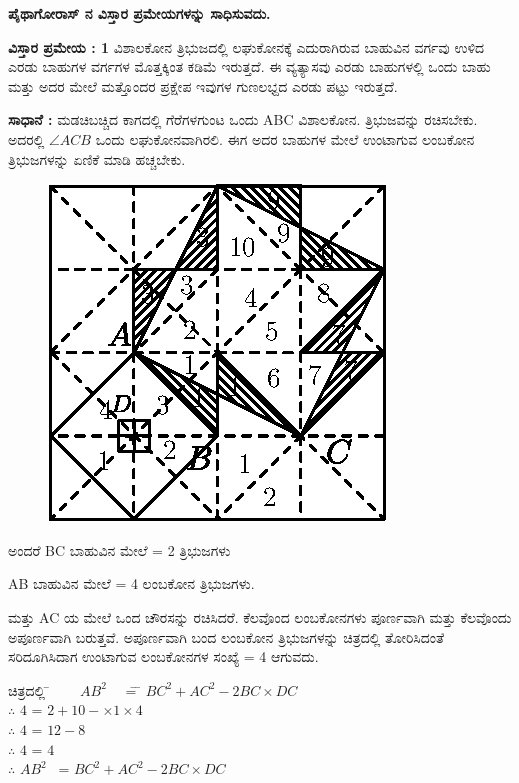 \medskip
\noindent
\textbf{ಪೈಥಾಗೋರಾಸ್ ನ ವಿಸ್ತಾರ ಪ್ರಮೇಯಗಳನ್ನು ಸಾಧಿಸುವದು.}

\medskip
\noindent
\textbf{ವಿಸ್ತಾರ ಪ್ರಮೇಯ : 1} ವಿಶಾಲಕೋನ ತ್ರಿಭುಜದಲ್ಲಿ ಲಘುಕೋನಕ್ಕೆ ಎದುರಾಗಿರುವ ಬಾಹುವಿನ ವರ್ಗವು ಉಳಿದ ಎರಡು ಬಾಹುಗಳ ವರ್ಗಗಳ ಮೊತ್ತಕ್ಕಿಂತ ಕಡಿಮೆ ಇರುತ್ತದೆ. ಈ ವ್ಯತ್ಯಾಸವು ಎರಡು ಬಾಹುಗಳಲ್ಲಿ ಒಂದು ಬಾಹು ಮತ್ತು ಅದರ ಮೇಲೆ ಮತ್ತೊಂದರ ಪ್ರಕ್ಷೇಪ ಇವುಗಳ ಗುಣಲಭ್ದದ ಎರಡು ಪಟ್ಟು ಇರುತ್ತದೆ. 

\medskip
\noindent
\textbf{ಸಾಧಾನೆ :} ಮಡಚಿಬಚ್ಚಿದ ಕಾಗದಲ್ಲಿ ಗೆರೆಗಳಗುಂಟ ಒಂದು ABC ವಿಶಾಲಕೋನ. ತ್ರಿಭುಜವನ್ನು ರಚಿಸಬೇಕು. ಅದರಲ್ಲಿ $\angle ACB$ ಒಂದು ಲಘುಕೋನವಾಗಿರಲಿ. ಈಗ ಅದರ ಬಾಹುಗಳ ಮೇಲೆ ಉಂಟಾಗುವ ಲಂಬಕೋನ ತ್ರಿಭುಜಗಳನ್ನು ಏಣಿಕೆ ಮಾಡಿ ಹಚ್ಚಬೇಕು. 
\begin{figure}[H]
\centering
\includegraphics[scale=.98]{src/figure/chap1/fig1-17f.eps}
\end{figure} 

ಅಂದರೆ BC ಬಾಹುವಿನ ಮೇಲೆ = 2  ತ್ರಿಭುಜಗಳು 

AB ಬಾಹುವಿನ ಮೇಲೆ = 4 ಲಂಬಕೋನ ತ್ರಿಭುಜಗಳು. 

ಮತ್ತು AC ಯ ಮೇಲೆ ಒಂದ ಚೌರಸನ್ನು ರಚಿಸಿದರೆ. ಕೆಲವೊಂದ ಲಂಬಕೋನಗಳು ಪೂರ್ಣವಾಗಿ ಮತ್ತು ಕೆಲವೊಂದು ಅಪೂರ್ಣವಾಗಿ ಬರುತ್ತವೆ. ಅಪೂರ್ಣವಾಗಿ ಬಂದ ಲಂಬಕೋನ ತ್ರಿಭುಜಗಳನ್ನು ಚಿತ್ರದಲ್ಲಿ ತೋರಿಸಿದಂತೆ ಸರಿದೂಗಿಸಿದಾಗ ಉಂಟಾಗುವ ಲಂಬಕೋನಗಳ ಸಂಖ್ಯೆ = 4 ಆಗುವದು. 

\begin{tabbing}
 ಚಿತ್ರದಲ್ಲಿ \quad 	\= ~~~ 			$AB^2$~~ \= =  \= $BC^2 + AC^2 - 2 BC \times DC$\\
  $\therefore$ \> \quad $4$ \>  = \> $2+10- \times 1 \times 4$\\
   $\therefore$ \> \quad  $4$ \> = \> $12-8$\\
   $\therefore$ \> \quad $4 $ \> = \> $4$ \\
 $\therefore $ \>  $AB^2$~ \> = \> $BC^2 + AC^2 - 2 BC \times DC$
\end{tabbing}

